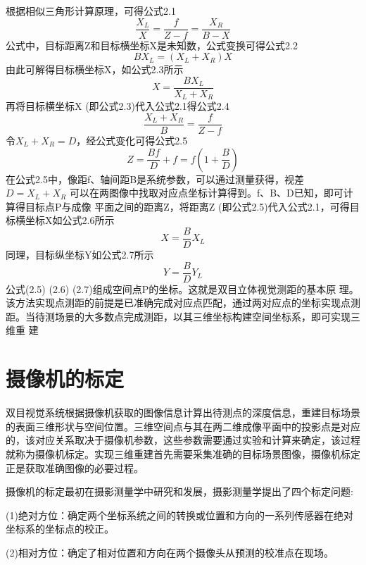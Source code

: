 根据相似三角形计算原理，可得公式2.1
\begin{equation}
\frac{X_{L}}{X}=\frac{f}{Z-f}=\frac{X_{R}}{B-X}
\end{equation}
公式中，目标距离Z和目标横坐标X是未知数，公式变换可得公式2.2
\begin{equation}
BX_{L}=(X_{L}+X_{R})X
\end{equation}
由此可解得目标横坐标X，如公式2.3所示
\begin{equation}
X=\frac{BX_{L}}{X_{L}+X_{R}}
\end{equation}
再将目标横坐标X (即公式2.3)代入公式2.1得公式2.4
\begin{equation}
\frac{X_{L}+X_{R}}{B}=\frac{f}{Z-f}
\end{equation}
令$X_{L}+X_{R}=D$，经公式变化可得公式2.5
\begin{equation}
Z=\frac{Bf}{D}+f=f(1+\frac{B}{D})
\end{equation}
在公式2.5中，像距f、轴间距B是系统参数，可以通过测量获得，视差$D=X_{L}+X_{R}$
可以在两图像中找取对应点坐标计算得到。f、B、D已知，即可计算得目标点P与成像
平面之间的距离Z，将距离Z (即公式2.5)代入公式2.1，可得目标横坐标X如公式2.6所示
\begin{equation}
X=\frac{B}{D}X_{L}
\end{equation}
同理，目标纵坐标Y如公式2.7所示
\begin{equation}
Y=\frac{B}{D}Y_{L}
\end{equation}
公式(2.5) (2.6) (2.7)组成空间点P的坐标。这就是双目立体视觉测距的基本原
理。该方法实现点测距的前提是已准确完成对应点匹配，通过两对应点的坐标实现点测
距。当待测场景的大多数点完成测距，以其三维坐标构建空间坐标系，即可实现三维重
建


\section{摄像机的标定}

双目视觉系统根据摄像机获取的图像信息计算出待测点的深度信息，重建目标场景的表面三维形状与空间位置。三维空间点与其在两二维成像平面中的投影点是对应的，该对应关系取决于摄像机参数，这些参数需要通过实验和计算来确定，该过程就称为摄像机标定。实现三维重建首先需要采集准确的目标场景图像，摄像机标定正是获取准确图像的必要过程。

摄像机的标定最初在摄影测量学中研究和发展，摄影测量学提出了四个标定问题:

(1)绝对方位：确定两个坐标系统之间的转换或位置和方向的一系列传感器在绝对坐标系的坐标点的校正。

(2)相对方位：确定了相对位置和方向在两个摄像头从预测的校准点在现场。

